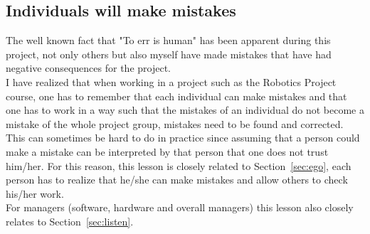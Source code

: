 \subsection{Individuals will make mistakes}
The well known fact that "To err is human" has been apparent during this project, not only others but also myself have made mistakes that have had negative consequences for the project. \\ %
I have realized that when working in a project such as the Robotics Project course, one has to remember that each individual can make mistakes and that one has to work in a way such that the mistakes of an individual do not become a mistake of the whole project group, mistakes need to be found and corrected. %
This can sometimes be hard to do in practice since assuming that a person could make a mistake can be interpreted by that person that one does not trust him/her. For this reason, this lesson is closely related to Section~\ref{sec:ego}, each person has to realize that he/she can make mistakes and allow others to check his/her work. \\
For managers (software, hardware and overall managers) this lesson also closely relates to Section~\ref{sec:listen}.


